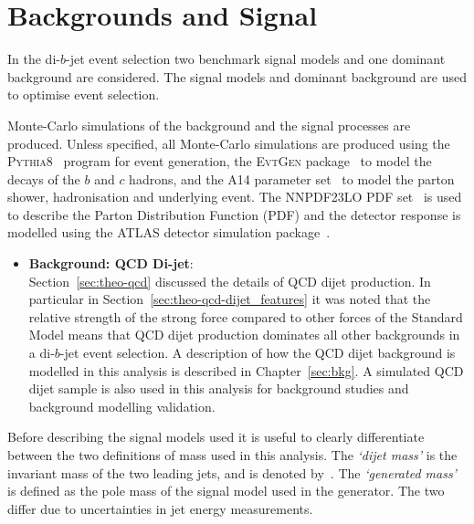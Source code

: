 \section{Backgrounds and Signal}
\label{sec:evt-s+b}

In the di-$b$-jet event selection two
benchmark signal models and one dominant background are considered.
The signal models and dominant background are
used to optimise event selection.

Monte-Carlo simulations of the background and the signal processes are produced.
Unless specified, all Monte-Carlo simulations are produced using
the \textsc{Pythia8}~\cite{dibjet-pythia8} program for event generation,
the \textsc{EvtGen} package~\cite{trig-evtGen} to model the decays of the $b$ and $c$ hadrons,
and the A14 parameter set~\cite{dibjet-a14} to model the parton shower, hadronisation and underlying event.
The NNPDF23LO PDF set~\cite{dibjet-nnpdf} is used to describe the Parton Distribution Function (PDF) and
the detector response is modelled using the ATLAS detector simulation package~\cite{dijet-sim_ATLAS}.

\begin{itemize}[leftmargin=*]
\item\textbf{Background: QCD Di-jet}:  \\
  Section~\ref{sec:theo-qcd} discussed the details of QCD dijet production.
  In particular in Section~\ref{sec:theo-qcd-dijet_features} it was noted that the
  relative strength of the strong force compared to other forces
  of the Standard Model means that QCD dijet production dominates all other backgrounds in a di-$b$-jet event selection.
  A description of how the QCD dijet background is modelled in this analysis is described in Chapter~\ref{sec:bkg}.
  A simulated QCD dijet sample is also used in this analysis
  for background studies and background modelling validation.
  \end{itemize}

\noindent
Before describing the signal models used it is useful to clearly differentiate between the two definitions of mass used in this analysis.
The \textit{`dijet mass'} is the invariant mass of the two leading jets, and is denoted by~\mjj.
The \textit{`generated mass'} is defined as the pole mass of the signal model used in the generator.
The two differ due to uncertainties in jet energy measurements.

